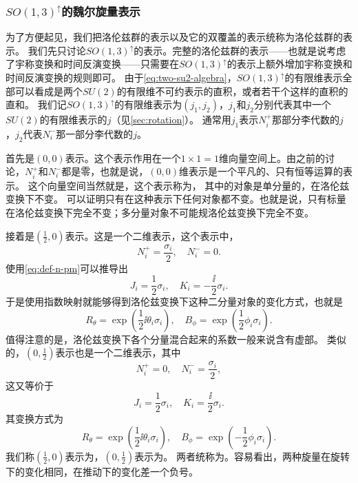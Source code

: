 \subsubsection{$SO(1,3)^\uparrow$的魏尔旋量表示}\label{sec:weyl-spinor-representation}

为了方便起见，我们把洛伦兹群的表示以及它的双覆盖的表示统称为洛伦兹群的表示。
我们先只讨论$SO(1,3)^\uparrow$的表示。完整的洛伦兹群的表示——也就是说考虑了宇称变换和时间反演变换——只需要在$SO(1,3)^\uparrow$的表示上额外增加宇称变换和时间反演变换的规则即可。
由于\eqref{eq:two-su2-algebra}，$SO(1,3)^\uparrow$的有限维表示全部可以看成是两个$SU(2)$的有限维不可约表示的直积，或者若干个这样的直积的直和。
我们记$SO(1,3)^\uparrow$的有限维表示为$(j_1, j_2)$，$j_1$和$j_2$分别代表其中一个$SU(2)$的有限维表示的$j$（见\autoref{sec:rotation}）。
通常用$j_1$表示$N^+_i$那部分李代数的$j$，$j_2$代表$N^-_i$那一部分李代数的$j$。

首先是$(0,0)$表示。这个表示作用在一个$1\times1 = 1$维向量空间上。由之前的讨论，$N^+_i$和$N^-_i$都是零，也就是说，$(0,0)$维表示是一个平凡的、只有恒等运算的表示。
这个向量空间当然就是，这个表示称为，
其中的对象是单分量的，在洛伦兹变换下不变。
可以证明只有在这种表示下任何对象都不变。也就是说，只有标量在洛伦兹变换下完全不变；多分量对象不可能规洛伦兹变换下完全不变。

接着是$(\frac{1}{2}, 0)$表示。这是一个二维表示，这个表示中，
\begin{equation}
    N^+_i = \frac{\sigma_i}{2}, \quad N^-_i = 0.
\end{equation}
使用\eqref{eq:def-n-pm}可以推导出
\begin{equation}
    J_i = \frac{1}{2} \sigma_i, \quad K_i = - \frac{\ii}{2} \sigma_i.
\end{equation}
于是使用指数映射就能够得到洛伦兹变换下这种二分量对象的变化方式，也就是
\begin{equation}
    R_\theta = \exp \left( \frac{1}{2} \ii \theta_i \sigma_i \right), \quad B_\phi = \exp \left( \frac{1}{2} \phi_i \sigma_i \right).
\end{equation}
值得注意的是，洛伦兹变换下各个分量混合起来的系数一般来说含有虚部。
类似的，$(0, \frac{1}{2})$表示也是一个二维表示，其中
\begin{equation}
    N^+_i = 0, \quad N^-_i = \frac{\sigma_i}{2},
\end{equation}
这又等价于
\begin{equation}
    J_i = \frac{1}{2} \sigma_i, \quad K_i = \frac{\ii}{2} \sigma_i.
\end{equation}
其变换方式为
\begin{equation}
    R_\theta = \exp \left( \frac{1}{2} \ii \theta_i \sigma_i \right), \quad B_\phi = \exp \left( - \frac{1}{2} \phi_i \sigma_i \right).
\end{equation}
我们称$(\frac{1}{2}, 0)$表示为，$(0, \frac{1}{2})$表示为。
两者统称为。容易看出，两种旋量在旋转下的变化相同，在推动下的变化差一个负号。

